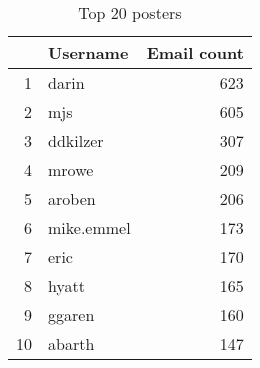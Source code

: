 \begin{table}[!htpb]
\begin{center}
\begin{tabular}{rlr}
  \hline
 & Username & Email count \\ 
  \hline
1 & darin & 623 \\ 
  2 & mjs & 605 \\ 
  3 & ddkilzer & 307 \\ 
  4 & mrowe & 209 \\ 
  5 & aroben & 206 \\ 
  6 & mike.emmel & 173 \\ 
  7 & eric & 170 \\ 
  8 & hyatt & 165 \\ 
  9 & ggaren & 160 \\ 
  10 & abarth & 147 \\
   \hline
\end{tabular}
\caption{Top 20 posters}
\label{emails:top20}
\end{center}
\end{table}
